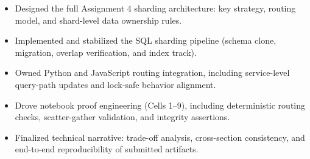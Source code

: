 \documentclass[a4paper,12pt]{article}
\begin{document}
\vspace{4pt}

\begin{tcolorbox}[
  enhanced,
  colback=white,
  colframe=iitgnblue!62,
  boxrule=0.85pt,
  arc=5pt,
  left=6pt,right=6pt,top=5pt,bottom=5pt,
  borderline west={2.4pt}{0pt}{iitgnblue},
  title={\faGithub\enspace\textbf{Pushkar Nikunjkumar Modi → Primary Implementation Lead}},
  colbacktitle=iitgnblue!8,
  coltitle=iitgnblue!85!black,
  fonttitle=\small\bfseries
]
\begin{itemize}[nosep,leftmargin=*,label=\textcolor{iitgnblue!80!black}{\tiny{}}]
  \item Designed the full Assignment 4 sharding architecture: key strategy, routing model, and shard-level data ownership rules.
  \item Implemented and stabilized the SQL sharding pipeline (schema clone, migration, overlap verification, and index track).
  \item Owned Python and JavaScript routing integration, including service-level query-path updates and lock-safe behavior alignment.
  \item Drove notebook proof engineering (Cells 1--9), including deterministic routing checks, scatter-gather validation, and integrity assertions.
  \item Finalized technical narrative: trade-off analysis, cross-section consistency, and end-to-end reproducibility of submitted artifacts.
\end{itemize}
\end{tcolorbox}

\vspace{4pt}
\end{document}
